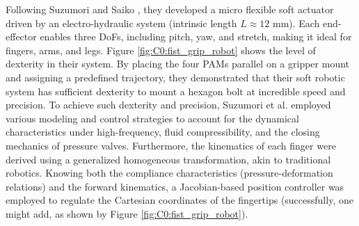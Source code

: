 Following Suzumori and Saiko \cite{Suzumori1991, Suzumori1992}, they developed a micro flexible soft actuator driven by an electro-hydraulic system (intrinsic length $L \approx 12$ \si{\milli\meter}). Each end-effector enables three DoFs, including pitch, yaw, and stretch, making it ideal for fingers, arms, and legs. Figure \ref{fig:C0:fist_grip_robot} shows the level of dexterity in their system. By placing the four PAMs parallel on a gripper mount and assigning a predefined trajectory, they demonstrated that their soft robotic system has sufficient dexterity to mount a hexagon bolt at incredible speed and precision. To achieve such dexterity and precision, Suzumori et al. \cite{Suzumori1991} employed various modeling and control strategies to account for the dynamical characteristics under high-frequency, fluid compressibility, and the closing mechanics of pressure valves. Furthermore, the kinematics of each finger were derived using a generalized homogeneous transformation, akin to traditional robotics. Knowing both the compliance characteristics (pressure-deformation relations) and the forward kinematics, a Jacobian-based position controller was employed to regulate the Cartesian coordinates of the fingertips (successfully, one might add, as shown by Figure \ref{fig:C0:fist_grip_robot}).
%
